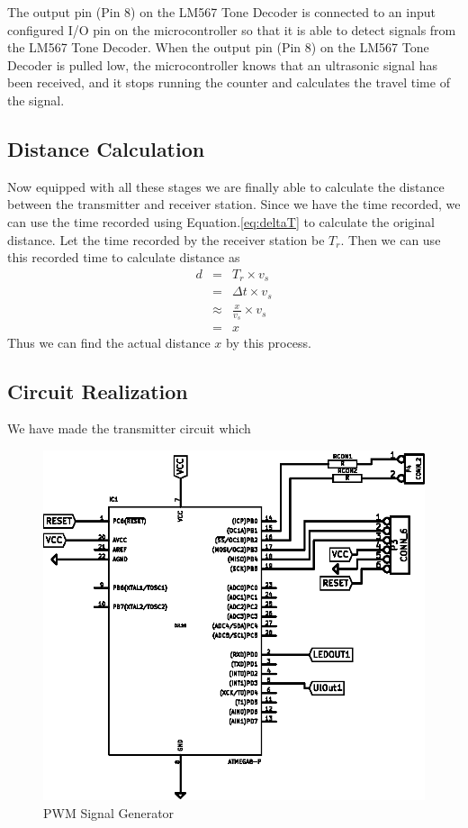 The output pin (Pin 8) on the LM567 Tone Decoder is connected to an input configured I/O pin on the microcontroller so that it is able to detect signals from the LM567 Tone Decoder. When the output pin (Pin 8) on the LM567 Tone Decoder is pulled low, the microcontroller knows that an ultrasonic signal has been received, and it stops running the counter and calculates the travel time of the signal.

\subsection{Distance Calculation}
Now equipped with all these stages we are finally able to calculate the distance between the transmitter and receiver station. Since we have the time recorded, we can use the time recorded using Equation.\ref{eq:deltaT} to calculate the original distance. Let the time recorded by the receiver station be $T_r$. Then we can use this recorded time to calculate distance as
\begin{eqnarray*}
	d &=& T_r \times v_s\\
	{}&=&\Delta t \times v_s\\
	{}&\approx&\frac{x}{v_s} \times v_s\\
	{}& = & x
\end{eqnarray*}
Thus we can find the actual distance $x$ by this process.



\subsection{Circuit Realization}
We have made the transmitter circuit which 

\begin{figure}
	\centering
	\includegraphics{Images/PWMGenerator.eps}
	\caption{PWM Signal Generator}
	\label{fig:PWMGenerator}
\end{figure}

